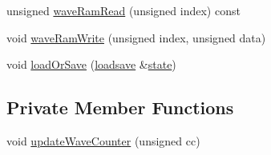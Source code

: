 \begin{DoxyCompactItemize}
\item 
unsigned \hyperlink{classgambatte_1_1Channel3_aaab70bedfa5561f68bf8b562b9bbec07}{wave\+Ram\+Read} (unsigned index) const
\item 
void \hyperlink{classgambatte_1_1Channel3_ae4dfc2534984a5255816a9383c2c0307}{wave\+Ram\+Write} (unsigned index, unsigned data)
\item 
void \hyperlink{classgambatte_1_1Channel3_affe1d4cd442fb9cbdfef697ad6dbcd2b}{load\+Or\+Save} (\hyperlink{classgambatte_1_1loadsave}{loadsave} \&\hyperlink{ppu_8cpp_a2f2eca6997ee7baf8901725ae074d45b}{state})
\end{DoxyCompactItemize}
\subsection*{Private Member Functions}
\begin{DoxyCompactItemize}
\item 
void \hyperlink{classgambatte_1_1Channel3_a3ac9a519fecd48cd847de615afabbf3d}{update\+Wave\+Counter} (unsigned cc)
\end{DoxyCompactItemize}

